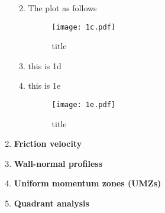 \documentclass[11pt,letterpaper]{article}
\begin{document}
\begin{enumerate}
\begin{enumerate}
\begin{equation}
                    \end{equation}
              \item The plot as follows
                    \begin{figure}[H]
                        \centering
                        \texttt{[image: 1c.pdf]}
                        \caption{title}
                        \label{1c}
                    \end{figure}
              \item this is 1d
              \item this is 1e
                    \begin{figure}[H]
                        \centering
                        \texttt{[image: 1e.pdf]}
                        \caption{title}
                        \label{1e}
                    \end{figure}
          \end{enumerate}
    \item \textbf{Friction velocity}
    \item \textbf{Wall-normal profiless}
    \item \textbf{Uniform momentum zones (UMZs)}
    \item \textbf{Quadrant analysis}
\end{enumerate}




\end{document}
